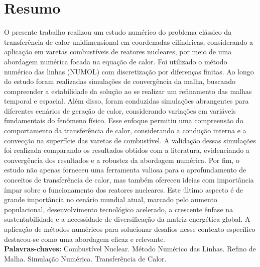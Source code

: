 \chapter*{Resumo}

O presente trabalho realizou um estudo numérico do problema clássico da transferência de calor unidimensional em coordenadas cilíndricas, considerando a aplicação em varetas combustíveis de reatores nucleares, por meio de uma abordagem numérica focada na equação de calor. Foi utilizado o método numérico das linhas (NUMOL) com discretização por diferenças finitas. Ao longo do estudo foram realizadas simulações de convergência da malha, buscando compreender a estabilidade da solução ao se realizar um refinamento das malhas temporal e espacial. Além disso, foram conduzidas simulações abrangentes para diferentes cenários de geração de calor, considerando variações em variáveis fundamentais do fenômeno físico. Esse enfoque permitiu uma compreensão do comportamento da transferência de calor, considerando a condução interna e a convecção na superfície das varetas de combustível. A validação dessas simulações foi realizada comparando os resultados obtidos com a literatura, evidenciando a convergência dos resultados e a robustez da abordagem numérica. Por fim, o estudo não apenas forneceu uma ferramenta valiosa para o aprofundamento de conceitos de transferência de calor, mas também ofereceu ideias com importância ímpar sobre o funcionamento dos reatores nucleares. Este último aspecto é de grande importância no cenário mundial atual, marcado pelo aumento populacional, desenvolvimento tecnológico acelerado, a crescente ênfase na sustentabilidade e a necessidade de diversificação da matriz energética global. A aplicação de métodos numéricos para solucionar desafios nesse contexto específico destacou-se como uma abordagem eficaz e relevante. \\

\textbf{Palavras-chaves:} Combustível Nuclear. Método Numérico das Linhas. Refino de Malha. Simulação Numérica. Transferência de Calor.